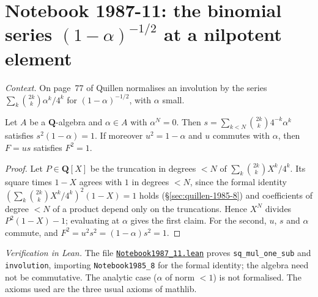 \section[Notebook 1987-11: the binomial series at a nilpotent]{Notebook 1987-11: the binomial series $(1 - \alpha)^{-1/2}$ at a nilpotent element\protect{}}\label{sec:quillen-1987-11}

\emph{Context.} On page~77 of  Quillen normalises an involution by the series $\sum_k\binom{2k}{k}\alpha^k/4^k$ for $(1 - \alpha)^{-1/2}$, with $\alpha$ small.

\begin{encadre}
\begin{theoreme}\label{thm:quillen-1987-11}
Let $A$ be a $\mathbf Q$-algebra and $\alpha \in A$ with $\alpha^N = 0$. Then $s = \sum_{k<N}\binom{2k}{k}4^{-k}\alpha^k$ satisfies $s^2(1 - \alpha) = 1$. If moreover $u^2 = 1 - \alpha$ and $u$ commutes with $\alpha$, then $F = us$ satisfies $F^2 = 1$.
\end{theoreme}
\end{encadre}

\begin{proof}
Let $P \in \mathbf Q[X]$ be the truncation in degrees $< N$ of $\sum_k\binom{2k}k X^k/4^k$. Its square times $1 - X$ agrees with $1$ in degrees $< N$, since the formal identity $(\sum_k\binom{2k}kX^k/4^k)^2(1 - X) = 1$ holds (\S\ref{sec:quillen-1985-8}) and coefficients of degree $< N$ of a product depend only on the truncations. Hence $X^N$ divides $P^2(1 - X) - 1$; evaluating at $\alpha$ gives the first claim. For the second, $u$, $s$ and $\alpha$ commute, and $F^2 = u^2s^2 = (1 - \alpha)s^2 = 1$.
\end{proof}

\emph{Verification in Lean.} The file \href{\leanblobmain/Notebook1987_11.lean}{\texttt{Notebook1987\_11.\allowbreak{}lean}} proves \texttt{sq\_mul\_one\_sub} and \texttt{involution}, importing \texttt{Notebook1985\_8} for the formal identity; the algebra need not be commutative. The analytic case ($\alpha$ of norm $< 1$) is not formalised. The axioms used are the three usual axioms of mathlib.

